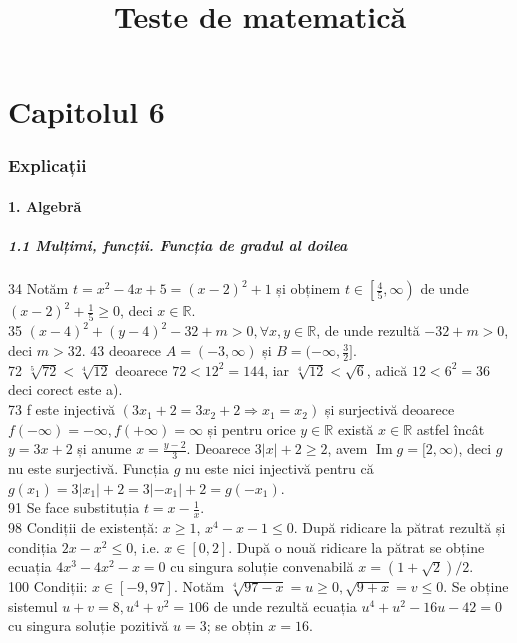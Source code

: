 \documentclass[11pt]{article}
\title{Teste de matematică}
\author{}
\date{}
\begin{document}
\maketitle

\part*{Capitolul 6}
\section*{Explicații}
\subsection*{1. Algebră}
\subsubsection*{1.1 Mulțimi, funcții. Funcția de gradul al doilea}
34 Notăm $t=x^{2}-4 x+5=(x-2)^{2}+1$ și obținem $t \in\left[\frac{4}{5}, \infty\right)$ de unde $(x-2)^{2}+\frac{1}{5} \geq 0$, deci $x \in \mathbb{R}$.\\
35 $(x-4)^{2}+(y-4)^{2}-32+m>0, \forall x, y \in \mathbb{R}$, de unde rezultă $-32 + m > 0$, deci $m>32$. 43 deoarece $A=(-3, \infty)$ și $B=(-\infty, \frac{3}{2}]$.\\
72 $\sqrt[5]{72}<\sqrt[4]{12}$ deoarece $72<12^{2}=144$, iar $\sqrt[4]{12}<\sqrt{6}$, adică $12<6^{2}=36$ deci corect este a).\\
73 f este injectivă $\left(3 x_{1}+2=3 x_{2}+2 \Rightarrow x_{1}=x_{2}\right)$ și surjectivă deoarece $f(-\infty)=-\infty, f(+\infty)=\infty$ și pentru orice $y \in \mathbb{R}$ există $x \in \mathbb{R}$ astfel încât $y=3 x+2$ și anume $x=\frac{y-2}{3}$. Deoarece $3|x|+2 \geq 2$, avem $\operatorname{Im} g=[2, \infty)$, deci $g$ nu este surjectivă. Funcția $g$ nu este nici injectivă pentru că $g\left(x_{1}\right)=3\left|x_{1}\right|+2=3\left|-x_{1}\right|+2=g\left(-x_{1}\right)$.\\
91 Se face substituția $t=x-\frac{1}{x}$.\\
98 Condiții de existență: $x \geq 1$, $x^{4}-x-1 \leq 0$. După ridicare la pătrat rezultă și condiția $2 x-x^{2} \leq 0$, i.e. $x \in[0,2]$. După o nouă ridicare la pătrat se obține ecuația $4 x^{3}-4 x^{2}-x=0$ cu singura soluție convenabilă $x=(1+\sqrt{2}) / 2$.\\
100 Condiții: $x \in[-9,97]$. Notăm $\sqrt[4]{97-x}=u \geq 0, \sqrt{9+x}=v \leq 0$. Se obține sistemul $u+v=8, u^{4}+v^{2}=106$ de unde rezultă ecuația $u^{4}+u^{2}-16 u-42=0$ cu singura soluție pozitivă $u=3$; se obțin $x=16$.\\
\end{document}

